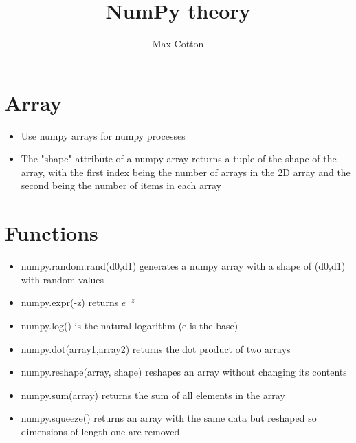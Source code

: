 \documentclass[10pt,a4paper]{article}
\title{NumPy theory}
\author{Max Cotton}
\date{}
\begin{document}
\maketitle

\section{Array}

\begin{itemize}
    \item Use numpy arrays for numpy processes
    \item The "shape" attribute of a numpy array returns a tuple of the shape of the array, with the first index being the number of arrays in the 2D array and the second being the number of items in each array
\end{itemize}

\section{Functions}

\begin{itemize}
    \item numpy.random.rand(d0,d1) generates a numpy array with a shape of (d0,d1) with random values
    \item numpy.expr(-z) returns $e^{-z}$
    \item numpy.log() is the natural logarithm (e is the base)
    \item numpy.dot(array1,array2) returns the dot product of two arrays
    \item numpy.reshape(array, shape) reshapes an array without changing its contents
    \item numpy.sum(array) returns the sum of all elements in the array
    \item numpy.squeeze() returns an array with the same data but reshaped so dimensions of length one are removed
\end{itemize}
\end{document}
